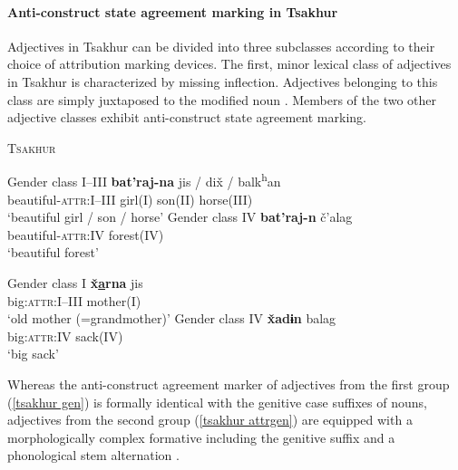 \paragraph{Anti-construct state agreement marking in Tsakhur}
Adjectives in Tsa\-khur can be divided into three subclasses according to their choice of attribution marking devices. The first, minor lexical class of adjectives in Tsakhur is characterized by missing inflection. Adjectives belonging to this class are simply juxtaposed to the modified noun \citep[383]{talibov2004}. Members of the two other adjective classes exhibit anti-construct state agreement marking.
\begin{exe}
\ex \textsc{Tsakhur} \citep[382]{talibov2004}
\begin{xlist}
\ex	\label{tsakhur gen}
\begin{xlist}
\ex	Gender class I–III
\gll	\textbf{bat'raj-na} jis / dix̌ / balk\textsuperscript{h}an\\
	 beautiful-\textsc{attr:I–III} girl(\textsc{I}) { } son(\textsc{II}) { } horse(\textsc{III})\\
\glt	 ‘beautiful girl / son / horse’
\ex	Gender class IV
\gll	\textbf{bat'raj-n}	č'alag\\
	beautiful-\textsc{attr:IV} forest(\textsc{IV})\\
\glt	‘beautiful forest’
\end{xlist}
\ex \label{tsakhur attrgen}
\begin{xlist}
\ex	Gender class I
\gll	\textbf{x̌\underline{a}rna} jis\\
	big:\textsc{attr:I–III} mother(\textsc{I})\\
\glt	‘old mother (=grandmother)’
\ex	Gender class IV
\gll	\textbf{x̌adɨn} balag\\
	big:\textsc{attr:IV} sack(\textsc{IV})\\
\glt	‘big sack’
\end{xlist}
\end{xlist}
\end{exe}
Whereas the anti-construct agreement marker of adjectives from the first group (\ref{tsakhur gen}) is formally identical with the genitive case suffixes of nouns, adjectives from the second group (\ref{tsakhur attrgen}) are equipped with a morphologically complex formative including the genitive suffix and a phonological stem alternation \citep[382]{talibov2004}.

